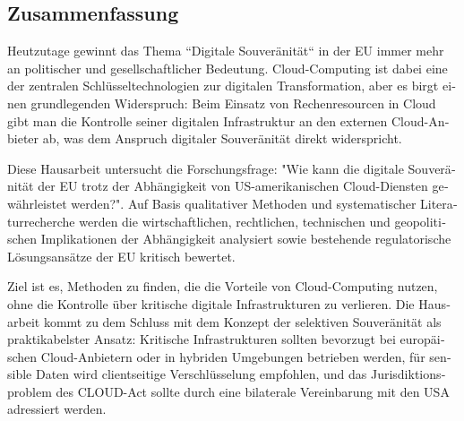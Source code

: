 \begin{otherlanguage}{ngerman}
	\chapter*{Zusammenfassung}
Heutzutage gewinnt das Thema ``Digitale Souveränität`` in der \ac{EU} immer mehr an politischer und gesellschaftlicher Bedeutung. Cloud-Computing ist dabei eine der zentralen Schlüsseltechnologien zur digitalen Transformation, aber es birgt einen grundlegenden Widerspruch: Beim Einsatz von Rechenresourcen in Cloud gibt man die Kontrolle seiner digitalen Infrastruktur an den externen Cloud-Anbieter ab, was dem Anspruch digitaler Souveränität direkt widerspricht. 

Diese Hausarbeit untersucht die Forschungsfrage: "Wie kann die digitale Souveränität der \ac{EU} trotz der Abhängigkeit von US-amerikanischen Cloud-Diensten gewährleistet werden?". Auf Basis qualitativer Methoden und systematischer Literaturrecherche werden die wirtschaftlichen, rechtlichen, technischen und geopolitischen Implikationen der Abhängigkeit analysiert sowie bestehende regulatorische Lösungsansätze der \ac{EU} kritisch bewertet.

Ziel ist es, Methoden zu finden, die die Vorteile von Cloud-Computing nutzen, ohne die Kontrolle über kritische digitale Infrastrukturen zu verlieren. Die Hausarbeit kommt zu dem Schluss mit dem Konzept der selektiven Souveränität als praktikabelster Ansatz: Kritische Infrastrukturen sollten bevorzugt bei europäischen Cloud-Anbietern oder in hybriden Umgebungen betrieben werden, für sensible Daten wird clientseitige Verschlüsselung empfohlen, und das Jurisdiktionsproblem des \ac{CLOUD-Act} sollte durch eine bilaterale Vereinbarung mit den \ac{USA} adressiert werden.

\end{otherlanguage}
